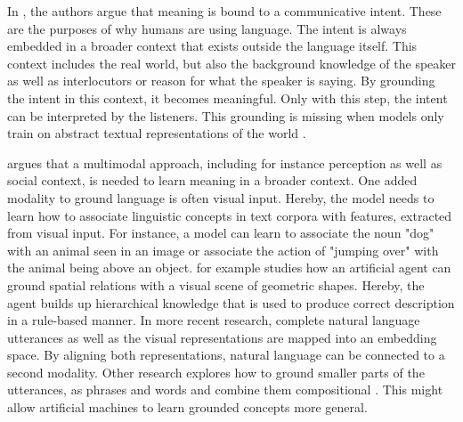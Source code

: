 In \citep{Bender2020}, the authors argue that meaning is bound to a communicative intent.
These are the purposes of why humans are using language.
The intent is always embedded in a broader context that exists outside the language itself.
This context includes the real world, but also the background knowledge of the speaker as well as interlocutors or reason for what the speaker is saying.
By grounding the intent in this context, it becomes meaningful.
Only with this step, the intent can be interpreted by the listeners.
This grounding is missing when models only train on abstract textual representations of the world \citep{Regier1996,Landau1998}.

\citet{Bisk2020} argues that a multimodal approach, including for instance perception as well as social context, is needed to learn meaning in a broader context.
One added modality to ground language is often visual input.
Hereby, the model needs to learn how to associate linguistic concepts in text corpora with features, extracted from visual input.
For instance, a model can learn to associate the noun "dog" with an animal seen in an image or associate the action of "jumping over" with the animal being above an object.
\cite{Roy2002} for example studies how an artificial agent can ground spatial relations with a visual scene of geometric shapes.
Hereby, the agent builds up hierarchical knowledge that is used to produce correct description in a rule-based manner.
In more recent research, complete natural language utterances as well as the visual representations are mapped into an embedding space.
By aligning both representations, natural language can be connected to a second modality.
Other research explores how to ground smaller parts of the utterances, as phrases and words and combine them compositional \citep{Larsson2018,Kollar2010}.
This might allow artificial machines to learn grounded concepts more general.

